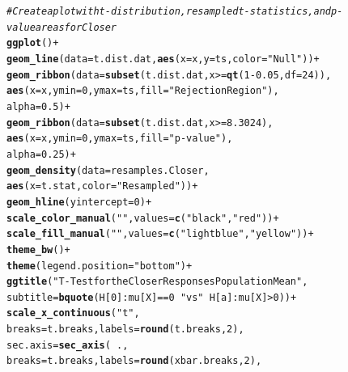 \documentclass{article}\usepackage[]{graphicx}\usepackage[]{xcolor}
\makeatletter
\newcommand{\hlnum}[1]{\textcolor[rgb]{0.686,0.059,0.569}{#1}}%
\newcommand{\hlsng}[1]{\textcolor[rgb]{0.192,0.494,0.8}{#1}}%
\newcommand{\hlcom}[1]{\textcolor[rgb]{0.678,0.584,0.686}{\textit{#1}}}%
\newcommand{\hlopt}[1]{\textcolor[rgb]{0,0,0}{#1}}%
\newcommand{\hldef}[1]{\textcolor[rgb]{0.345,0.345,0.345}{#1}}%
\newcommand{\hlkwc}[1]{\textcolor[rgb]{0.333,0.667,0.333}{#1}}%
\newcommand{\hlkwd}[1]{\textcolor[rgb]{0.737,0.353,0.396}{\textbf{#1}}}%
\newenvironment{kframe}{%
 \def\at@end@of@kframe{}%
 \ifinner\ifhmode%
  \def\at@end@of@kframe{\end{minipage}}%
  \begin{minipage}{\columnwidth}%
 \fi\fi%
 \def\FrameCommand##1{\hskip\@totalleftmargin \hskip-\fboxsep
 \colorbox{shadecolor}{##1}\hskip-\fboxsep
     \hskip-\linewidth \hskip-\@totalleftmargin \hskip\columnwidth}%
 \MakeFramed {\advance\hsize-\width
   \@totalleftmargin\z@ \linewidth\hsize
   \@setminipage}}%
 {\par\unskip\endMakeFramed%
 \at@end@of@kframe}
\newenvironment{knitrout}{}{} %
\makeatother
\begin{document}
\begin{enumerate}
\begin{enumerate}
\begin{knitrout}
\begin{kframe}
\begin{alltt}
\hlcom{# Create a plot with t-distribution, resampled t-statistics, and p-value areas for Closer}
\hlkwd{ggplot}\hldef{()} \hlopt{+}
  \hlkwd{geom_line}\hldef{(}\hlkwc{data} \hldef{= t.dist.dat,} \hlkwd{aes}\hldef{(}\hlkwc{x} \hldef{= x,} \hlkwc{y} \hldef{= ts,} \hlkwc{color} \hldef{=} \hlsng{"Null"}\hldef{))} \hlopt{+}
  \hlkwd{geom_ribbon}\hldef{(}\hlkwc{data} \hldef{=} \hlkwd{subset}\hldef{(t.dist.dat, x} \hlopt{>=} \hlkwd{qt}\hldef{(}\hlnum{1} \hlopt{-} \hlnum{0.05}\hldef{,} \hlkwc{df} \hldef{=} \hlnum{24}\hldef{)),}
              \hlkwd{aes}\hldef{(}\hlkwc{x} \hldef{= x,} \hlkwc{ymin} \hldef{=} \hlnum{0}\hldef{,} \hlkwc{ymax} \hldef{= ts,} \hlkwc{fill} \hldef{=} \hlsng{"Rejection Region"}\hldef{),}
              \hlkwc{alpha} \hldef{=} \hlnum{0.5}\hldef{)} \hlopt{+}
  \hlkwd{geom_ribbon}\hldef{(}\hlkwc{data} \hldef{=} \hlkwd{subset}\hldef{(t.dist.dat, x} \hlopt{>=} \hlnum{8.3024}\hldef{),}
              \hlkwd{aes}\hldef{(}\hlkwc{x} \hldef{= x,} \hlkwc{ymin} \hldef{=} \hlnum{0}\hldef{,} \hlkwc{ymax} \hldef{= ts,} \hlkwc{fill} \hldef{=} \hlsng{"p-value"}\hldef{),}
              \hlkwc{alpha} \hldef{=} \hlnum{0.25}\hldef{)} \hlopt{+}
  \hlkwd{geom_density}\hldef{(}\hlkwc{data} \hldef{= resamples.Closer,}
               \hlkwd{aes}\hldef{(}\hlkwc{x} \hldef{= t.stat,} \hlkwc{color} \hldef{=} \hlsng{"Resampled"}\hldef{))} \hlopt{+}
  \hlkwd{geom_hline}\hldef{(}\hlkwc{yintercept} \hldef{=} \hlnum{0}\hldef{)} \hlopt{+}
  \hlkwd{scale_color_manual}\hldef{(}\hlsng{""}\hldef{,} \hlkwc{values} \hldef{=} \hlkwd{c}\hldef{(}\hlsng{"black"}\hldef{,} \hlsng{"red"}\hldef{))} \hlopt{+}
  \hlkwd{scale_fill_manual}\hldef{(}\hlsng{""}\hldef{,} \hlkwc{values} \hldef{=} \hlkwd{c}\hldef{(}\hlsng{"lightblue"}\hldef{,} \hlsng{"yellow"}\hldef{))} \hlopt{+}
  \hlkwd{theme_bw}\hldef{()} \hlopt{+}
  \hlkwd{theme}\hldef{(}\hlkwc{legend.position} \hldef{=} \hlsng{"bottom"}\hldef{)} \hlopt{+}
  \hlkwd{ggtitle}\hldef{(}\hlsng{"T-Test for the Closer Responses Population Mean"}\hldef{,}
          \hlkwc{subtitle} \hldef{=} \hlkwd{bquote}\hldef{(H[}\hlnum{0}\hldef{]}\hlopt{:}\hldef{mu[X]} \hlopt{==} \hlnum{0} \hlopt{~} \hlsng{"vs"} \hlopt{~} \hldef{H[a]}\hlopt{:}\hldef{mu[X]} \hlopt{>} \hlnum{0}\hldef{))} \hlopt{+}
  \hlkwd{scale_x_continuous}\hldef{(}\hlsng{"t"}\hldef{,}
                     \hlkwc{breaks} \hldef{= t.breaks,} \hlkwc{labels} \hldef{=} \hlkwd{round}\hldef{(t.breaks,} \hlnum{2}\hldef{),}
                     \hlkwc{sec.axis} \hldef{=} \hlkwd{sec_axis}\hldef{(}\hlopt{~} \hldef{.,}
                                         \hlkwc{breaks} \hldef{= t.breaks,} \hlkwc{labels} \hldef{=} \hlkwd{round}\hldef{(xbar.breaks,} \hlnum{2}\hldef{),}

\end{alltt}
\end{kframe}
\end{knitrout}
\end{enumerate}
\end{enumerate}
\end{document}

